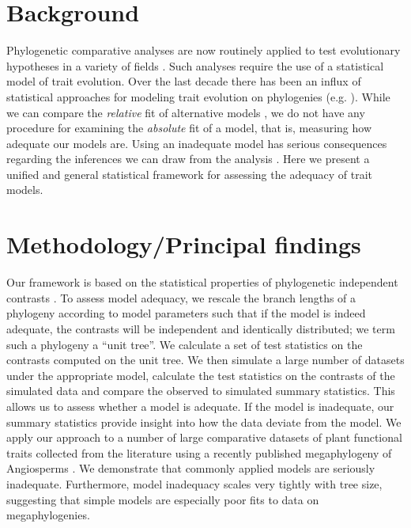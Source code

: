 \documentclass[a4paper,12pt]{article}
\begin{document}

\section*{Background}

Phylogenetic comparative analyses are now routinely applied to test evolutionary hypotheses in a variety of fields \citep{PennellHarmon}. Such analyses require the use of a statistical model of trait evolution. Over the last decade there has been an influx of statistical approaches for modeling trait evolution on phylogenies (e.g. \citep{ButlerKing2004, Omeara2006, Eastman2011, Beaulieu2012}). While we can compare the \textit{relative} fit of alternative models \citep{Harmon2010}, we do not have any procedure for examining the \textit{absolute} fit of a model, that is, measuring how adequate our models are. Using an inadequate model has serious consequences regarding the inferences we can draw from the analysis \citep{Boettiger2012, SlaterPennell}. Here we present a unified and general statistical framework for assessing the adequacy of trait models.

\section*{Methodology/Principal findings}

Our framework is based on the statistical properties of phylogenetic independent contrasts \citep{Felsenstein1985}. To assess model adequacy, we rescale the branch lengths of a phylogeny according to model parameters such that if the model is indeed adequate, the contrasts will be independent and identically distributed; we term such a phylogeny a ``unit tree''. We calculate a set of test statistics on the contrasts computed on the unit tree. We then simulate a large number of datasets under the appropriate model, calculate the test statistics on the contrasts of the simulated data and compare the observed to simulated summary statistics. This allows us to assess whether a model is adequate. If the model is inadequate, our summary statistics provide insight into how the data deviate from the model. We apply our approach to a number of large comparative datasets of plant functional traits collected from the literature using a recently published megaphylogeny of Angiosperms \citep{Zanne2013}. We demonstrate that commonly applied models are seriously inadequate. Furthermore, model inadequacy scales very tightly with tree size, suggesting that simple models are especially poor fits to data on megaphylogenies.
\end{document}
